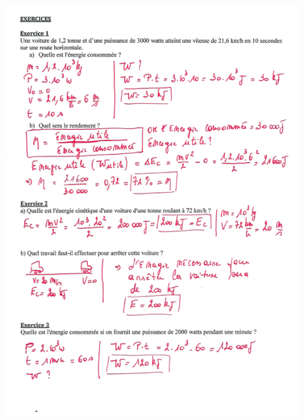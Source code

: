 \includegraphics[width=18.226cm,height=25.4cm]{Pictures/100000010000023F00000321650A721E7772A454.png}

